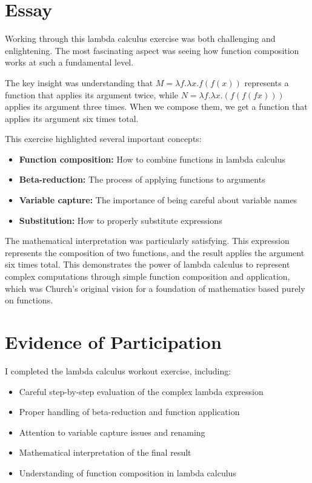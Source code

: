 \documentclass{article}
\theoremstyle{plain}
\theoremstyle{definition}
\theoremstyle{remark}
\begin{document}
\section{Essay}

Working through this lambda calculus exercise was both challenging and enlightening. The most fascinating aspect was seeing how function composition works at such a fundamental level.

The key insight was understanding that $M = \lambda f.\lambda x.f(f(x))$ represents a function that applies its argument twice, while $N = \lambda f.\lambda x.(f(f(f x)))$ applies its argument three times. When we compose them, we get a function that applies its argument six times total.

This exercise highlighted several important concepts:

\begin{itemize}
\item \textbf{Function composition:} How to combine functions in lambda calculus
\item \textbf{Beta-reduction:} The process of applying functions to arguments
\item \textbf{Variable capture:} The importance of being careful about variable names
\item \textbf{Substitution:} How to properly substitute expressions
\end{itemize}

The mathematical interpretation was particularly satisfying. This expression represents the composition of two functions, and the result applies the argument six times total. This demonstrates the power of lambda calculus to represent complex computations through simple function composition and application, which was Church's original vision for a foundation of mathematics based purely on functions.

\section{Evidence of Participation}

I completed the lambda calculus workout exercise, including:

\begin{itemize}
\item Careful step-by-step evaluation of the complex lambda expression
\item Proper handling of beta-reduction and function application
\item Attention to variable capture issues and renaming
\item Mathematical interpretation of the final result
\item Understanding of function composition in lambda calculus
\end{itemize}
\end{document}
